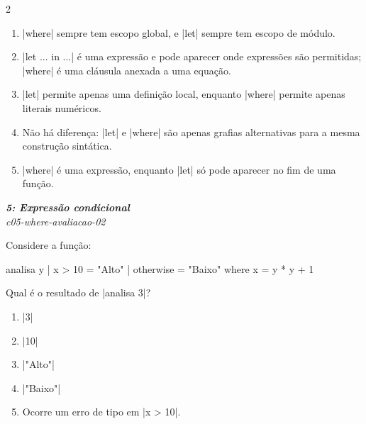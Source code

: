 \documentclass[a4paper,10pt,brazil]{article}
\begin{document}
\begin{multicols}{2}
\begin{enumerate}
  \item \haskellinline|where| sempre tem escopo global, e \haskellinline|let| sempre tem escopo de módulo.

  \item \haskellinline|let ... in ...| é uma expressão e pode aparecer onde expressões são permitidas; \haskellinline|where| é uma cláusula anexada a uma equação.

  \item \haskellinline|let| permite apenas uma definição local, enquanto \haskellinline|where| permite apenas literais numéricos.

  \item Não há diferença: \haskellinline|let| e \haskellinline|where| são apenas grafias alternativas para a mesma construção sintática.

  \item \haskellinline|where| é uma expressão, enquanto \haskellinline|let| só pode aparecer no fim de uma função.


\end{enumerate}

\begin{flushright}
  \footnotesize
  \textit{\textbf{5: Expressão condicional}}\\
  \textit{c05-where-avaliacao-02}\\

\end{flushright}
Considere a função:
\begin{haskellcode}
analisa y
  | x > 10    = "Alto"
  | otherwise = "Baixo"
  where
    x = y * y + 1
\end{haskellcode}
Qual é o resultado de \haskellinline|analisa 3|?

\begin{enumerate}
  \item \haskellinline|3|

  \item \haskellinline|10|

  \item \haskellinline|"Alto"|

  \item \haskellinline|"Baixo"|

  \item Ocorre um erro de tipo em \haskellinline|x > 10|.


\end{enumerate}


\end{multicols}
\end{document}
